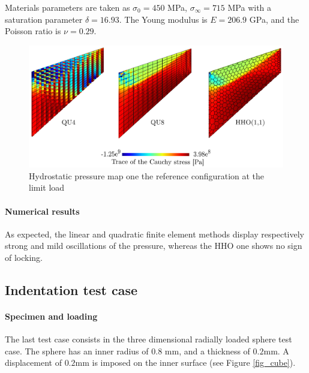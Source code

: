 Materials parameters are taken as
$\sigma_0 = 450$ MPa, $\sigma_{\infty} = 715$ MPa with a saturation parameter $\delta = 16.93$. The Young modulus is $E = 206.9$ GPa, and the Poisson ratio is $\nu = 0.29$.

\begin{figure}[H]
    \centering
    \includegraphics[width=14.cm]{../chapter_002_hho_mechanics/drawings/cook.png}
    \caption{Hydrostatic pressure map one the reference configuration at the limit load}
    \label{fig_cook}
\end{figure}

\paragraph{Numerical results}

As expected, the linear and quadratic finite element methods display respectively strong and mild oscillations of the pressure, whereas the HHO one shows no sign of locking.

\subsection{Indentation test case}

\paragraph{Specimen and loading}

The last test case consists in the three dimensional radially loaded sphere test case.
The sphere has an inner radius of $0.8$ mm, and a thickness of $0.2$mm.
A displacement of $0.2$mm is imposed on the inner surface (see Figure \ref{fig_cube}).

